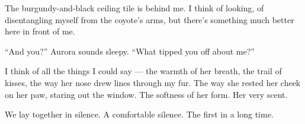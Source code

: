 The burgundy-and-black ceiling tile is behind me. I think of looking, of disentangling myself from the coyote's arms, but there's something much better here in front of me.

``And you?'' Aurora sounds sleepy. ``What tipped you off about me?''

I think of all the things I could say --- the warmth of her breath, the trail of kisses, the way her nose drew lines through my fur. The way she rested her cheek on her paw, staring out the window. The softness of her form. Her very scent.

We lay together in silence. A comfortable silence. The first in a long time.
